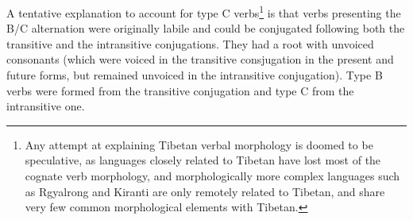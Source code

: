 \documentclass[oldfontcommands,oneside,a4paper,11pt]{article}
\begin{document}
A tentative explanation to account for type C verbs\footnote{Any attempt at explaining Tibetan verbal morphology is doomed to be speculative, as languages closely related to Tibetan have lost most of the   cognate verb morphology, and morphologically more complex languages such as Rgyalrong and  Kiranti  are only remotely related to Tibetan, and share very few common morphological elements with Tibetan.} is that verbs presenting the B/C alternation were originally labile and could be conjugated following both the transitive and the intransitive conjugations. They had a root with unvoiced consonants (which were voiced in the transitive consjugation in the present and future forms, but remained unvoiced in the intransitive conjugation). Type B verbs were formed from the transitive conjugation and type C from the intransitive one.
 




 
\end{document}
